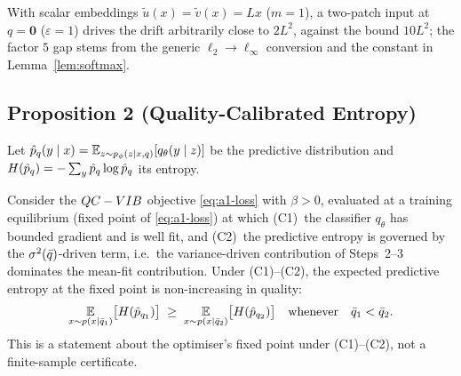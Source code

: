 \begin{remark}\label{rem:a1-drift-tight}
With scalar embeddings $\tilde{u}(x)=\tilde{v}(x)=Lx$ ($m=1$), a two-patch input at $q=\mathbf{0}$
($\varepsilon=1$) drives the drift arbitrarily close to $2L^2$, against the bound $10L^2$; the factor
$5$ gap stems from the generic $\ell_2\to\ell_\infty$ conversion and the constant in
Lemma~\ref{lem:softmax}.
\end{remark}

\subsection{Proposition 2 (Quality-Calibrated Entropy)}\label{app:a1-prop2}

Let $\hat{p}_q(y\mid x)=\operatorname*{\mathbb{E}}_{z\sim p_\phi(z\mid x,q)}[q_\theta(y\mid z)]$ be the predictive
distribution and $H(\hat{p}_q)=-\sum_y \hat{p}_q\log\hat{p}_q$ its entropy.

\begin{proposition}\label{prop:entmono-full}\label{prop:entmono}
Consider the $QC-VIB$ objective \eqref{eq:a1-loss} with $\beta>0$, evaluated at a training
equilibrium (fixed point of \eqref{eq:a1-loss}) at which (C1)~the classifier $q_\theta$ has
bounded gradient and is well fit, and (C2)~the predictive entropy is governed by the
$\sigma^2(\bar{q})$-driven term, i.e.\ the variance-driven contribution of Steps~2--3 dominates
the mean-fit contribution. Under (C1)--(C2), the expected predictive entropy at the fixed point
is non-increasing in quality:
\begin{equation}
\operatorname*{\mathbb{E}}_{x\sim p(x\mid\bar{q}_1)}\!\big[H(\hat{p}_{q_1})\big]
\;\geq\; \operatorname*{\mathbb{E}}_{x\sim p(x\mid\bar{q}_2)}\!\big[H(\hat{p}_{q_2})\big]
\quad\text{whenever}\quad \bar{q}_1<\bar{q}_2.
\label{eq:a1-entmono}
\end{equation}
This is a statement about the optimiser's fixed point under (C1)--(C2), not a finite-sample
certificate.
\end{proposition}

